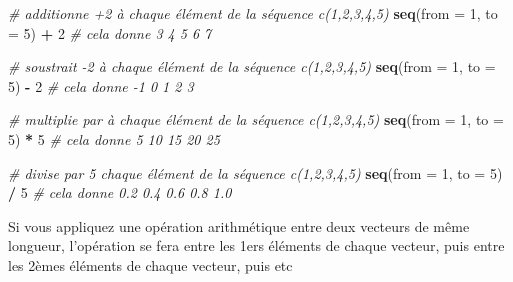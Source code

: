 \documentclass[
]{book}
\newenvironment{Shaded}{\begin{snugshade}}{\end{snugshade}}
\newcommand{\AttributeTok}[1]{\textcolor[rgb]{0.13,0.29,0.53}{#1}}
\newcommand{\CommentTok}[1]{\textcolor[rgb]{0.56,0.35,0.01}{\textit{#1}}}
\newcommand{\DecValTok}[1]{\textcolor[rgb]{0.00,0.00,0.81}{#1}}
\newcommand{\FunctionTok}[1]{\textcolor[rgb]{0.13,0.29,0.53}{\textbf{#1}}}
\newcommand{\NormalTok}[1]{#1}
\newcommand{\SpecialCharTok}[1]{\textcolor[rgb]{0.81,0.36,0.00}{\textbf{#1}}}
\begin{document}
\begin{Shaded}
\begin{Highlighting}[]
\CommentTok{\# additionne +2 à chaque élément de la séquence c(1,2,3,4,5)}
\FunctionTok{seq}\NormalTok{(}\AttributeTok{from =} \DecValTok{1}\NormalTok{, }\AttributeTok{to =} \DecValTok{5}\NormalTok{) }\SpecialCharTok{+} \DecValTok{2} \CommentTok{\# cela donne 3 4 5 6 7}

\CommentTok{\# soustrait {-}2 à chaque élément de la séquence c(1,2,3,4,5)}
\FunctionTok{seq}\NormalTok{(}\AttributeTok{from =} \DecValTok{1}\NormalTok{, }\AttributeTok{to =} \DecValTok{5}\NormalTok{) }\SpecialCharTok{{-}} \DecValTok{2} \CommentTok{\# cela donne {-}1  0  1  2  3}

\CommentTok{\# multiplie par à chaque élément de la séquence c(1,2,3,4,5)}
\FunctionTok{seq}\NormalTok{(}\AttributeTok{from =} \DecValTok{1}\NormalTok{, }\AttributeTok{to =} \DecValTok{5}\NormalTok{) }\SpecialCharTok{*} \DecValTok{5} \CommentTok{\# cela donne 5 10 15 20 25}

\CommentTok{\# divise par 5 chaque élément de la séquence c(1,2,3,4,5)}
\FunctionTok{seq}\NormalTok{(}\AttributeTok{from =} \DecValTok{1}\NormalTok{, }\AttributeTok{to =} \DecValTok{5}\NormalTok{) }\SpecialCharTok{/} \DecValTok{5} \CommentTok{\# cela donne 0.2 0.4 0.6 0.8 1.0}
\end{Highlighting}
\end{Shaded}

Si vous appliquez une opération arithmétique entre deux vecteurs de même longueur,
l'opération se fera entre les 1ers éléments de chaque vecteur, puis entre les 2èmes
éléments de chaque vecteur, puis etc
\end{document}
